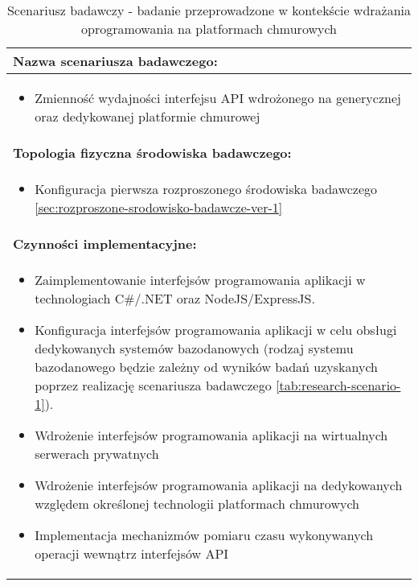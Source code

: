 \setlength{\LTcapwidth}{\textwidth}
\setlength\LTleft{0pt}
\setlength\LTright{0pt}
\begin{longtable}[c]{|llll|}
    \caption{Scenariusz badawczy - badanie przeprowadzone w kontekście wdrażania oprogramowania na platformach chmurowych}
    \label{tab:research-scenario-5}                                                  \\ \hline
    \multicolumn{4}{|l|}{\textbf{Nazwa scenariusza badawczego:}}                     \\ \hline
    \multicolumn{4}{|p{\linewidth}|}{
        \begin{itemize}[label={}]
            \item Zmienność wydajności interfejsu API wdrożonego na generycznej oraz dedykowanej platformie chmurowej
          \end{itemize}
    } \\ \hline
    \multicolumn{4}{|l|}{\textbf{Topologia fizyczna środowiska badawczego:}}         \\ \hline
    \multicolumn{4}{|p{\linewidth}|}{
        \begin{itemize}[label={}]
            \item Konfiguracja pierwsza rozproszonego środowiska badawczego \ref{sec:rozproszone-srodowisko-badawcze-ver-1}
          \end{itemize}
    }\\ \hline
    \multicolumn{4}{|l|}{\textbf{Czynności implementacyjne:}}                        \\ \hline
    \multicolumn{4}{|p{\linewidth}|}{
        \begin{itemize}
            \item Zaimplementowanie interfejsów programowania aplikacji w technologiach C\#/.NET oraz NodeJS/ExpressJS.
            \item Konfiguracja interfejsów programowania aplikacji w celu obsługi dedykowanych systemów bazodanowych (rodzaj systemu bazodanowego będzie zależny od wyników badań uzyskanych poprzez realizację scenariusza badawczego \ref{tab:research-scenario-1}).
            \item Wdrożenie interfejsów programowania aplikacji na wirtualnych serwerach prywatnych
            \item Wdrożenie interfejsów programowania aplikacji na dedykowanych względem określonej technologii platformach chmurowych
            \item Implementacja mechanizmów pomiaru czasu wykonywanych operacji wewnątrz interfejsów API

\end{itemize}}
\end{longtable}
